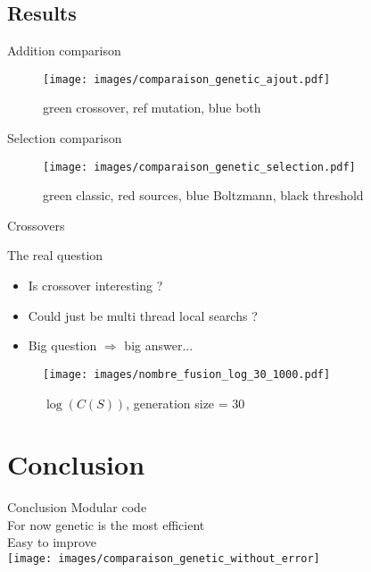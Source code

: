 \documentclass[11pt]{beamer}
\begin{document}
\subsection{Results}
\begin{frame}{Addition comparison}
\begin{figure}
\centering
\texttt{[image: images/comparaison\_genetic\_ajout.pdf]}
\caption{green crossover, ref mutation, blue both}
\label{compareajout}
\end{figure}

\end{frame}

\begin{frame}{Selection comparison}
\begin{figure}
\centering
\texttt{[image: images/comparaison\_genetic\_selection.pdf]}
\caption{green classic, red sources, blue Boltzmann, black threshold}
\label{compareselection}
\end{figure}
\end{frame}


\begin{frame}{Crossovers}

\begin{alertblock}{The real question}
\begin{itemize}
\item<1-> Is crossover interesting ? 
\item<2-> Could just be multi thread local searchs ? 
\item<3-> Big question $\Rightarrow$ big answer...
\end{itemize}
\end{alertblock}



\end{frame}

\begin{frame}
\begin{figure}
\centering
\texttt{[image: images/nombre\_fusion\_log\_30\_1000.pdf]}
\caption{$\log(C(S))$, generation size = 30}
\end{figure}

\end{frame}


\section{Conclusion}

\begin{frame}{Conclusion}
Modular code\\
For now genetic is the most efficient\\
Easy to improve\\
\centering
\texttt{[image: images/comparaison\_genetic\_without\_error]}
\end{frame}
\end{document}
